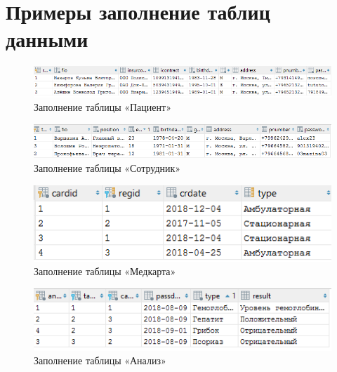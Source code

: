\documentclass[14pt,a4paper,russian]{extreport}
\begin{document}
\section*{Примеры заполнение таблиц данными}
\setlength{\textfloatsep}{2pt}
\begin{figure}[h!]
        \center\includegraphics[width=\textwidth]{patient}
        \caption{Заполнение таблицы «Пациент»}
        \label{fig:patient}
\end{figure}

\vspace{0.00mm}

\begin{figure}[h!]
        \center\includegraphics[scale=0.83]{employee}
        \caption{Заполнение таблицы «Сотрудник»}
        \label{fig:employee}
\end{figure}

\vspace{0.00mm}

\begin{figure}[h!]
        \center\includegraphics[scale=1]{medcard}
        \caption{Заполнение таблицы «Медкарта»}
        \label{fig:medcard}
\end{figure}

\vspace{0.00mm}

\begin{figure}[h!]
        \center\includegraphics[scale=1]{analysis}
        \caption{Заполнение таблицы «Анализ»}
        \label{fig:analysis}
\end{figure}
\end{document}
